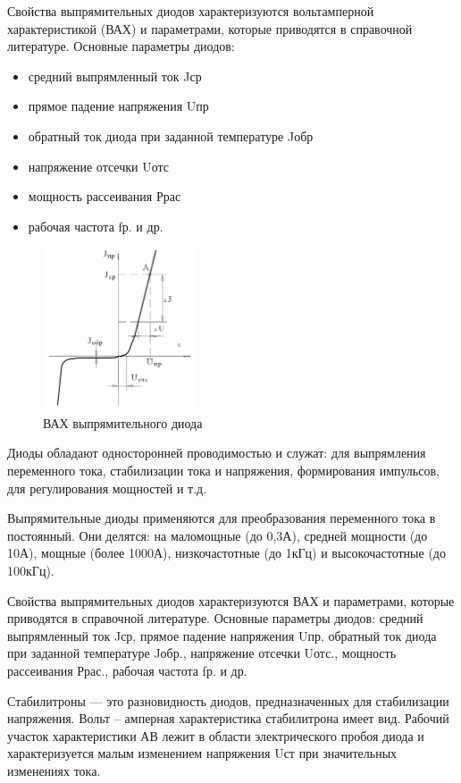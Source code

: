 \documentclass[unicode, 12pt, a4paper, oneside]{article}
\begin{document}
Свойства выпрямительных диодов характеризуются вольтамперной характеристикой (ВАХ) и параметрами, которые приводятся в справочной литературе.
Основные параметры диодов:
\begin{itemize}
\item средний выпрямленный ток Jср
\item прямое падение напряжения Uпр
\item обратный ток диода при заданной температуре Jобр
\item напряжение отсечки Uотс
\item мощность рассеивания Ррас
\item рабочая частота fр. и др.
\end{itemize}

\begin{figure}[htbp]
\centering
\includegraphics[width=0.4\textwidth]{2_VAC_of_diod.png}
\caption{ВАХ выпрямительного диода}
\label{fig:2_VAC_of_diod}
\end{figure}

Диоды обладают односторонней проводимостью и служат: для выпрямления переменного тока, стабилизации тока и напряжения, формирования импульсов, для регулирования мощностей и т.д.

Выпрямительные диоды применяются для преобразования переменного тока в постоянный. Они делятся: на маломощные (до 0,3А), средней мощности (до 10А), мощные (более 1000А), низкочастотные (до 1кГц) и высокочастотные (до 100кГц).

Свойства выпрямительных диодов характеризуются ВАХ и параметрами, которые приводятся в справочной литературе. Основные параметры диодов: средний выпрямленный ток Jср, прямое падение напряжения Uпр, обратный ток диода при заданной температуре Jобр., напряжение отсечки Uотс., мощность рассеивания Ррас., рабочая частота fр. и др.

Стабилитроны --- это разновидность диодов, предназначенных для стабилизации напряжения. Вольт – амперная характеристика стабилитрона имеет вид. Рабочий участок характеристики АВ лежит в области электрического пробоя диода и характеризуется малым изменением напряжения Uст при значительных изменениях тока.
\end{document}
